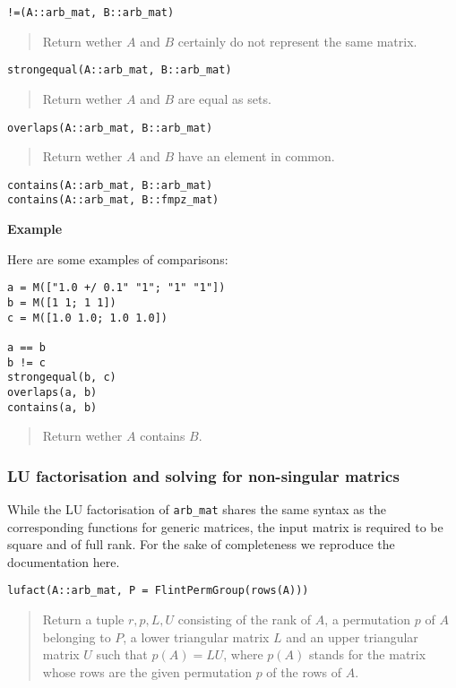\documentclass[a4paper,10pt]{article}
\newcommand{\code}{\lstinline}
\newcommand{\desc}[1]{\vspace{-3mm}\begin{quote}#1\end{quote}}
\begin{document}
{{\begin{lstlisting}
!=(A::arb_mat, B::arb_mat)
\end{lstlisting}

\desc{Return wether $A$ and $B$ certainly do not represent the same matrix.}

\begin{lstlisting}
strongequal(A::arb_mat, B::arb_mat)
\end{lstlisting}

\desc{Return wether $A$ and $B$ are equal as sets.}

\begin{lstlisting}
overlaps(A::arb_mat, B::arb_mat)
\end{lstlisting}

\desc{Return wether $A$ and $B$ have an element in common.}

\begin{lstlisting}
contains(A::arb_mat, B::arb_mat)
contains(A::arb_mat, B::fmpz_mat)
\end{lstlisting}

\textbf{Example}

Here are some examples of comparisons:

\begin{lstlisting}
a = M(["1.0 +/ 0.1" "1"; "1" "1"])
b = M([1 1; 1 1])
c = M([1.0 1.0; 1.0 1.0])

a == b
b != c
strongequal(b, c)
overlaps(a, b)
contains(a, b)
\end{lstlisting}

\desc{Return wether $A$ contains $B$.}

\subsubsection{LU factorisation and solving for non-singular matrics}

While the LU factorisation of \code{arb_mat} shares the same syntax
as the corresponding functions for generic matrices, the input matrix
is required to be square and of full rank. For the sake of completeness
we reproduce the documentation here.

\begin{lstlisting}
lufact(A::arb_mat, P = FlintPermGroup(rows(A)))
\end{lstlisting}

\desc{Return a tuple $r, p, L, U$ consisting of the rank of $A$, a permutation
$p$ of $A$ belonging to $P$, a lower triangular matrix $L$ and an upper
triangular matrix $U$ such that $p(A) = LU$, where $p(A)$ stands for the
matrix whose rows are the given permutation $p$ of the rows of $A$.

}}}
\end{document}
